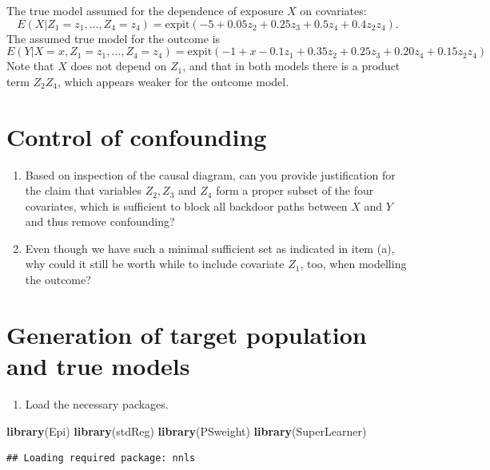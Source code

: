 \documentclass[
]{book}
\newenvironment{Shaded}{\begin{snugshade}}{\end{snugshade}}
\newcommand{\FunctionTok}[1]{\textcolor[rgb]{0.13,0.29,0.53}{\textbf{#1}}}
\newcommand{\NormalTok}[1]{#1}
\providecommand{\tightlist}{%
  \setlength{\itemsep}{0pt}\setlength{\parskip}{0pt}}
\begin{document}
The true model assumed for the dependence of exposure \(X\) on covariates:
\[ E(X|Z_1 = z_1, \dots, Z_4 = z_4) =
      \text{expit}(-5 + 0.05z_2 + 0.25z_3 + 0.5z_4 + 0.4z_2z_4) . \] The
assumed true model for the outcome is
\[ E(Y|X=x, Z_1 = z_1, \dots, Z_4 = z_4) =
           \text{expit}(-1 + x - 0.1z_1 + 0.35z_2 + 0.25z_3 +
                 0.20z_4 + 0.15z_2z_4) \] Note that \(X\) does not depend
on \(Z_1\), and that in both models there is a product term \(Z_2 Z_4\),
which appears weaker for the outcome model.

\section{Control of confounding}\label{control-of-confounding}

\begin{enumerate}
\def\labelenumi{\arabic{enumi}.}
\item
  Based on inspection of the causal diagram, can you provide
  justification for the claim that variables \(Z_2, Z_3\) and \(Z_4\) form
  a proper subset of the four covariates, which is sufficient to block
  all backdoor paths between \(X\) and \(Y\) and thus remove confounding?
\item
  Even though we have such a minimal sufficient set as indicated in
  item (a), why could it still be worth while to include covariate
  \(Z_1\), too, when modelling the outcome?
\end{enumerate}

\section{Generation of target population and true models}\label{generation-of-target-population-and-true-models}

\begin{enumerate}
\def\labelenumi{\arabic{enumi}.}
\tightlist
\item
  Load the necessary packages.
\end{enumerate}

\begin{Shaded}
\begin{Highlighting}[]
\FunctionTok{library}\NormalTok{(Epi)}
\FunctionTok{library}\NormalTok{(stdReg)}
\FunctionTok{library}\NormalTok{(PSweight)}
\FunctionTok{library}\NormalTok{(SuperLearner)}
\end{Highlighting}
\end{Shaded}

\begin{verbatim}
## Loading required package: nnls
\end{verbatim}
\end{document}
